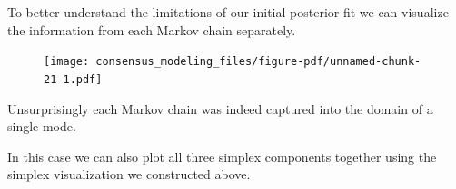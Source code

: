 \documentclass[
  letterpaper,
  DIV=11,
  numbers=noendperiod]{scrartcl}
\newenvironment{Shaded}{\begin{snugshade}}{\end{snugshade}}
\newcommand{\DecValTok}[1]{\textcolor[rgb]{0.68,0.00,0.00}{#1}}
\newcommand{\FunctionTok}[1]{\textcolor[rgb]{0.28,0.35,0.67}{#1}}
\newcommand{\NormalTok}[1]{\textcolor[rgb]{0.00,0.23,0.31}{#1}}
\newcommand{\OtherTok}[1]{\textcolor[rgb]{0.00,0.23,0.31}{#1}}
\newcommand{\SpecialCharTok}[1]{\textcolor[rgb]{0.37,0.37,0.37}{#1}}
\newcommand{\StringTok}[1]{\textcolor[rgb]{0.13,0.47,0.30}{#1}}
\begin{document}
To better understand the limitations of our initial posterior fit we can
visualize the information from each Markov chain separately.

\begin{Shaded}
\end{Shaded}

\begin{figure}[H]

{\centering \texttt{[image: consensus\_modeling\_files/figure-pdf/unnamed-chunk-21-1.pdf]}

}

\end{figure}

Unsurprisingly each Markov chain was indeed captured into the domain of
a single mode.

In this case we can also plot all three simplex components together
using the simplex visualization we constructed above.
\end{document}
